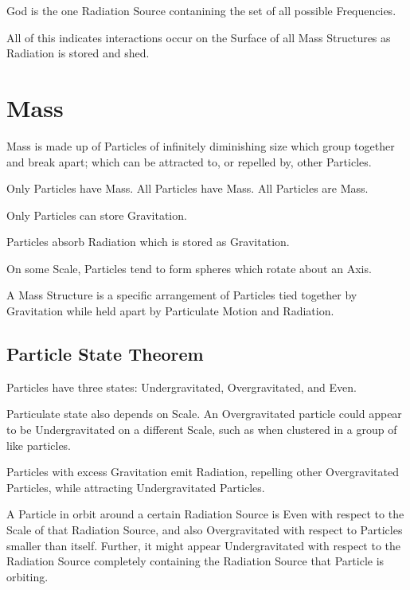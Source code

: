 \documentclass[12pt]{article}
\begin{document}
\begin{defn}
   God is the one Radiation Source contanining the set of all possible Frequencies.
\end{defn}

All of this indicates interactions occur on the Surface of all Mass Structures as Radiation is stored and shed.



\newpage
\section*{Mass}

\begin{thm}
   Mass is made up of Particles of infinitely diminishing size which group together and break apart; which can be attracted to, or repelled by, other Particles.
\end{thm}

Only Particles have Mass.  All Particles have Mass. All Particles are Mass.

Only Particles can store Gravitation.

Particles absorb Radiation which is stored as Gravitation.

On some Scale, Particles tend to form spheres which rotate about an Axis.


\begin{defn}
   A Mass Structure is a specific arrangement of Particles tied together by Gravitation while held apart by Particulate Motion and Radiation.
\end{defn}

\subsection{Particle State Theorem}
\begin{thm}
   Particles have three states: Undergravitated, Overgravitated, and Even.
\end{thm}

Particulate state also depends on Scale. An Overgravitated particle could appear to be Undergravitated on a different Scale, such as when clustered in a group of like particles.

Particles with excess Gravitation emit Radiation, repelling other Overgravitated Particles, while attracting Undergravitated Particles.

A Particle in orbit around a certain Radiation Source is Even with respect to the Scale of that Radiation Source, and also Overgravitated with respect to Particles smaller than itself. Further, it might appear Undergravitated with respect to the Radiation Source completely containing the Radiation Source that Particle is orbiting.
\end{document}

